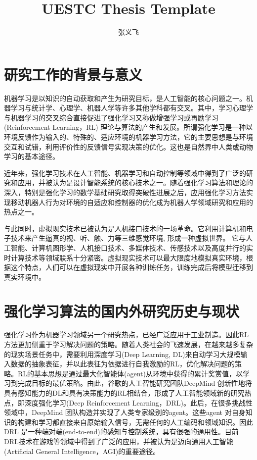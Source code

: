 \documentclass[bachelor]{thesis-uestc}
\title{UESTC Thesis Template}
\author{张义飞}
\begin{document}
	
	\begin{chineseabstract}
		[TODO]
		
	\end{chineseabstract}
	
	\begin{englishabstract}
		[TODO]
	\end{englishabstract}
	
	\thesistableofcontents
	
	\thesischapterexordium
	
	\section{研究工作的背景与意义}
	
	机器学习是以知识的自动获取和产生为研究目标，是人工智能的核心问题之一。机器学习与统计学、心理学、机器人学等许多其他学科都有交叉。其中，学习心理学与机器学习的交叉综合直接促进了强化学习又称做增强学习或再励学习(Reinforcement Learning，RL) 理论与算法的产生和发展。所谓强化学习是一种以环境反馈作为输入的、特殊的、适应环境的机器学习方法，它的主要思想是与环境交互和试错，利用评价性的反馈信号实现决策的优化。这也是自然界中人类或动物学习的基本途径。
	
	近年来，强化学习技术在人工智能、机器学习和自动控制等领域中得到了广泛的研究和应用，并被认为是设计智能系统的核心技术之一。随着强化学习算法和理论的深入，特别是强化学习的数学基础研究取得突破性进展之后，应用强化学习方法实现移动机器人行为对环境的自适应和控制器的优化成为机器人学领域研究和应用的热点之一。
	
	与此同时，虚拟现实技术已被认为是人机接口技术的一场革命。它利用计算机和电子技术来产生逼真的视、听、触、力等三维感觉环境, 形成一种虚拟世界。 它与人工智能、计算机图形学、人机接口技术、多媒体技术、传感技术以及高度并行的实时计算技术等领域联系十分紧密。虚拟现实技术可以最大限度地模拟真实环境，根据这个特点，人们可以在虚拟现实中开展各种训练任务，训练完成后将模型迁移到真实环境中。
	
	\section{强化学习算法的国内外研究历史与现状}
	强化学习作为机器学习领域另一个研究热点，已经广泛应用于工业制造。因此RL 方法更加侧重于学习解决问题的策略。随着人类社会的飞速发展，在越来越多复杂的现实场景任务中，需要利用深度学习(Deep Learning, DL)来自动学习大规模输入数据的抽象表征，并以此表征为依据进行自我激励的RL，优化解决问题的策略。RL的基本思想是通过最大化智能体(agent)从环境中获得的累计奖赏值，以学习到完成目标的最优策略。由此，谷歌的人工智能研究团队DeepMind 创新性地将具有感知能力的DL和具有决策能力的RL相结合，形成了人工智能领域新的研究热点，即深度强化学习(Deep Reinforcement Learning，DRL)。此后，在很多挑战性领域中，DeepMind 团队构造并实现了人类专家级别的agent。这些agent 对自身知识的构建和学习都直接来自原始输入信号，无需任何的人工编码和领域知识。因此DRL 是一种端对端(end-to-end)的感知与控制系统，具有很强的通用性。目前DRL技术在游戏等领域中得到了广泛的应用，并被认为是迈向通用人工智能(Artificial General Intelligence，AGI)的重要途径。
	
\end{document}
